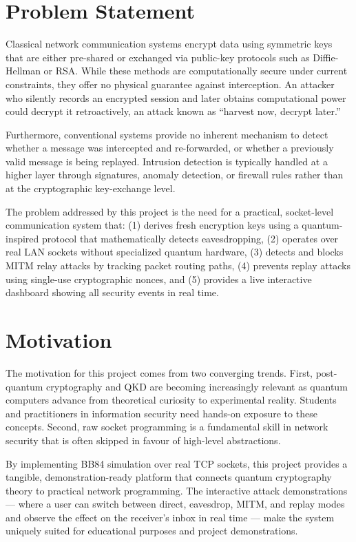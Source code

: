 \section{Problem Statement}

Classical network communication systems encrypt data using symmetric keys that are either pre-shared or exchanged via public-key protocols such as Diffie-Hellman or RSA. While these methods are computationally secure under current constraints, they offer no physical guarantee against interception. An attacker who silently records an encrypted session and later obtains computational power could decrypt it retroactively, an attack known as ``harvest now, decrypt later.''

Furthermore, conventional systems provide no inherent mechanism to detect whether a message was intercepted and re-forwarded, or whether a previously valid message is being replayed. Intrusion detection is typically handled at a higher layer through signatures, anomaly detection, or firewall rules rather than at the cryptographic key-exchange level.

The problem addressed by this project is the need for a practical, socket-level communication system that: (1) derives fresh encryption keys using a quantum-inspired protocol that mathematically detects eavesdropping, (2) operates over real LAN sockets without specialized quantum hardware, (3) detects and blocks MITM relay attacks by tracking packet routing paths, (4) prevents replay attacks using single-use cryptographic nonces, and (5) provides a live interactive dashboard showing all security events in real time.

\section{Motivation}

The motivation for this project comes from two converging trends. First, post-quantum cryptography and QKD are becoming increasingly relevant as quantum computers advance from theoretical curiosity to experimental reality. Students and practitioners in information security need hands-on exposure to these concepts. Second, raw socket programming is a fundamental skill in network security that is often skipped in favour of high-level abstractions.

By implementing BB84 simulation over real TCP sockets, this project provides a tangible, demonstration-ready platform that connects quantum cryptography theory to practical network programming. The interactive attack demonstrations --- where a user can switch between direct, eavesdrop, MITM, and replay modes and observe the effect on the receiver's inbox in real time --- make the system uniquely suited for educational purposes and project demonstrations.

